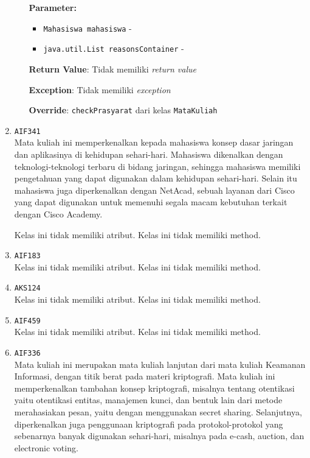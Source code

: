 \documentclass{article}
\begin{document}
\begin{enumerate}
\begin{itemize}
\textbf{Parameter:}\begin{itemize}
\item \texttt{Mahasiswa mahasiswa} - 
\item \texttt{java.util.List reasonsContainer} - 
\end{itemize}
\textbf{Return Value}: Tidak memiliki \textit{return value}

\textbf{Exception}: Tidak memiliki \textit{exception}

\textbf{Override}: \texttt{checkPrasyarat} dari kelas \texttt{MataKuliah}

\end{itemize}
\item \texttt{AIF341}\\ 
Mata kuliah ini memperkenalkan kepada mahasiswa konsep dasar 
 jaringan dan aplikasinya di kehidupan sehari-hari. Mahasiswa 
 dikenalkan dengan teknologi-teknologi terbaru di bidang jaringan, 
 sehingga mahasiswa memiliki pengetahuan yang dapat digunakan 
 dalam kehidupan sehari-hari. Selain itu mahasiswa juga 
 diperkenalkan dengan NetAcad, sebuah layanan dari Cisco yang 
 dapat digunakan untuk memenuhi segala macam kebutuhan terkait 
 dengan Cisco Academy.

Kelas ini tidak memiliki atribut. Kelas ini tidak memiliki method. \item \texttt{AIF183}\\ 


Kelas ini tidak memiliki atribut. Kelas ini tidak memiliki method. \item \texttt{AKS124}\\ 


Kelas ini tidak memiliki atribut. Kelas ini tidak memiliki method. \item \texttt{AIF459}\\ 


Kelas ini tidak memiliki atribut. Kelas ini tidak memiliki method. \item \texttt{AIF336}\\ 
Mata kuliah ini merupakan mata kuliah lanjutan dari mata kuliah Keamanan 
 Informasi, dengan titik berat pada materi kriptografi. Mata kuliah ini 
 memperkenalkan tambahan konsep kriptografi, misalnya tentang otentikasi 
 yaitu otentikasi entitas, manajemen kunci, dan bentuk lain dari metode 
 merahasiakan pesan, yaitu dengan menggunakan secret sharing. Selanjutnya, 
 diperkenalkan juga penggunaan kriptografi pada protokol-protokol yang 
 sebenarnya banyak digunakan sehari-hari, misalnya pada e-cash, auction, 
 dan electronic voting.


\end{enumerate}
\end{document}
